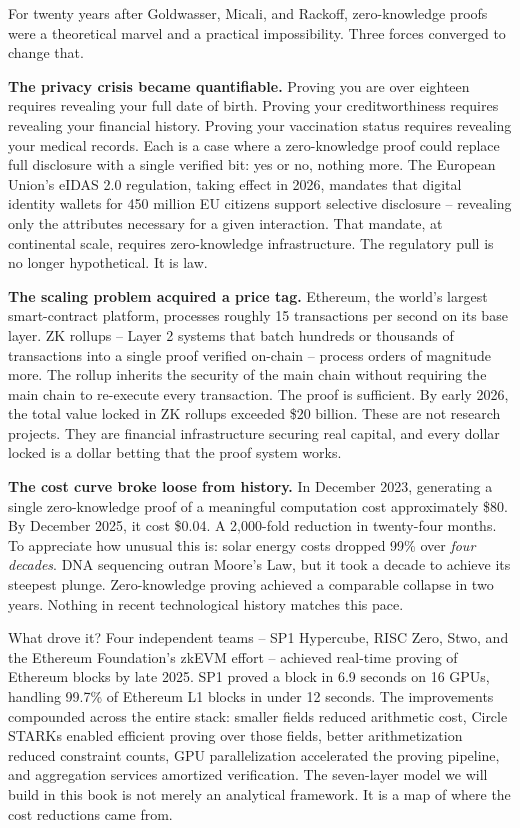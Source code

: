 \documentclass[
  11pt,
  openany]{report}
\renewcommand{\textbf}[1]{{\bfseries\color{MidnightBold}#1}}
\begin{document}
For twenty years after Goldwasser, Micali, and Rackoff, zero-knowledge proofs
were a theoretical marvel and a practical impossibility. Three forces converged
to change that.

\textbf{The privacy crisis became quantifiable.} Proving you are over eighteen
requires revealing your full date of birth. Proving your creditworthiness
requires revealing your financial history. Proving your vaccination status
requires revealing your medical records. Each is a case where a zero-knowledge
proof could replace full disclosure with a single verified bit: yes or no,
nothing more. The European Union's eIDAS 2.0 regulation, taking effect in 2026,
mandates that digital identity wallets for 450 million EU citizens support
selective disclosure -- revealing only the attributes necessary for a given
interaction. That mandate, at continental scale, requires zero-knowledge
infrastructure. The regulatory pull is no longer hypothetical. It is law.

\textbf{The scaling problem acquired a price tag.} Ethereum, the world's largest
smart-contract platform, processes roughly 15 transactions per second on its
base layer. ZK rollups -- Layer 2 systems that batch hundreds or thousands of
transactions into a single proof verified on-chain -- process orders of
magnitude more. The rollup inherits the security of the main chain without
requiring the main chain to re-execute every transaction. The proof is
sufficient. By early 2026, the total value locked in ZK rollups exceeded \$20
billion. These are not research projects. They are financial infrastructure
securing real capital, and every dollar locked is a dollar betting that the
proof system works.

\textbf{The cost curve broke loose from history.} In December 2023, generating a
single zero-knowledge proof of a meaningful computation cost approximately \$80.
By December 2025, it cost \$0.04. A 2,000-fold reduction in twenty-four months.
To appreciate how unusual this is: solar energy costs dropped 99\% over
\emph{four decades}. DNA sequencing outran Moore's Law, but it took a decade to
achieve its steepest plunge. Zero-knowledge proving achieved a comparable
collapse in two years. Nothing in recent technological history matches this
pace.

What drove it? Four independent teams -- SP1 Hypercube, RISC Zero, Stwo, and the
Ethereum Foundation's zkEVM effort -- achieved real-time proving of Ethereum
blocks by late 2025. SP1 proved a block in 6.9 seconds on 16 GPUs, handling
99.7\% of Ethereum L1 blocks in under 12 seconds. The improvements compounded
across the entire stack: smaller fields reduced arithmetic cost, Circle STARKs
enabled efficient proving over those fields, better arithmetization reduced
constraint counts, GPU parallelization accelerated the proving pipeline, and
aggregation services amortized verification. The seven-layer model we will build
in this book is not merely an analytical framework. It is a map of where the
cost reductions came from.
\end{document}
